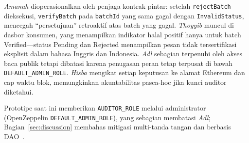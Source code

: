 \emph{Amanah} dioperasionalkan oleh penjaga kontrak pintar: setelah \texttt{rejectBatch} dieksekusi, \texttt{verifyBatch} pada \texttt{batchId} yang sama gagal dengan \texttt{InvalidStatus}, mencegah ``persetujuan'' retroaktif atas batch yang gagal.
\emph{Thoyyib} muncul di dasbor konsumen, yang menampilkan indikator halal positif hanya untuk batch Verified---status Pending dan Rejected menampilkan pesan tidak tersertifikasi eksplisit dalam bahasa Inggris dan Indonesia.
\emph{Adl} sebagian terpenuhi oleh akses baca publik tetapi dibatasi karena penugasan peran tetap terpusat di bawah \texttt{DEFAULT\_ADMIN\_ROLE}.
\emph{Hisba} mengikat setiap keputusan ke alamat Ethereum dan cap waktu blok, memungkinkan akuntabilitas pasca-hoc jika kunci auditor diketahui.

Prototipe saat ini memberikan \texttt{AUDITOR\_ROLE} melalui administrator (OpenZeppelin \texttt{DEFAULT\_ADMIN\_ROLE}), yang sebagian membatasi \emph{Adl}; Bagian~\ref{sec:discussion} membahas mitigasi multi-tanda tangan dan berbasis DAO~\cite{gnosis2024safe}.

\FloatBarrier
